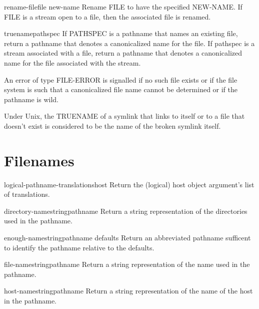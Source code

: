 \begin{function}{rename-file}{file new-name}{}{}
  Rename FILE to have the specified NEW-NAME. If FILE is a stream open to a
  file, then the associated file is renamed.
\end{function}

\begin{function}{truename}{pathspec}{}{}
  If PATHSPEC is a pathname that names an existing file, return
a pathname that denotes a canonicalized name for the file.  If
pathspec is a stream associated with a file, return a pathname
that denotes a canonicalized name for the file associated with
the stream.

An error of type FILE-ERROR is signalled if no such file exists
or if the file system is such that a canonicalized file name
cannot be determined or if the pathname is wild.

Under Unix, the TRUENAME of a symlink that links to itself or to
a file that doesn't exist is considered to be the name of the
broken symlink itself.
\end{function}

\section{Filenames}

\begin{accessor}{logical-pathname-translations}{host}{}{}
  Return the (logical) host object argument's list of translations.
\end{accessor}

\begin{function}{directory-namestring}{pathname}{}{}
  Return a string representation of the directories used in the pathname.
\end{function}

\begin{function}{enough-namestring}{pathname \op defaults}{}{}
  Return an abbreviated pathname sufficent to identify the pathname relative
   to the defaults.
\end{function}

\begin{function}{file-namestring}{pathname}{}{}
  Return a string representation of the name used in the pathname.
\end{function}

\begin{function}{host-namestring}{pathname}{}{}
  Return a string representation of the name of the host in the pathname.
\end{function}

